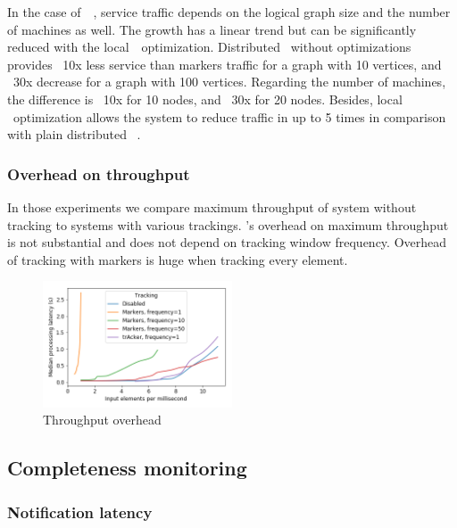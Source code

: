 In the case of~\tracker\ , service traffic depends on the logical graph size and the number of machines as well. The growth has a linear trend but can be significantly reduced with the local~\tracker\ optimization. Distributed \tracker\ without optimizations provides ~10x less service than markers traffic for a graph with 10 vertices, and ~30x decrease for a graph with 100 vertices. Regarding the number of machines, the difference is ~10x for 10 nodes, and ~30x for 20 nodes. Besides, local \tracker\ optimization allows the system to reduce traffic in up to 5 times in comparison with plain distributed \tracker\ .


\subsubsection{Overhead on throughput} \label{overhead}

In those experiments we compare maximum throughput of system without tracking to systems with various trackings. \tracker's overhead on maximum throughput is not substantial and does not depend on tracking window frequency. Overhead of tracking with markers is huge when tracking every element.

\begin{figure}[htbp]
  \centering
  \includegraphics[width=0.50\textwidth]{pics/throughput_overhead_50.png}
  \caption{Throughput overhead}
\end{figure}

\subsection{Completeness monitoring} \label{completeness}

\subsubsection{Notification latency}

